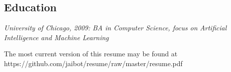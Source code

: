 \documentclass[line]{res} %
\begin{document}
\begin{resume}
\section{Education}

{\sl University of Chicago, 2009: BA in Computer Science, focus on Artificial Intelligence and Machine Learning}
 
\hspace{-10mm}
The most current version of this resume may be found at https://github.com/jaibot/resume/raw/master/resume.pdf
\end{resume}
\end{document}
